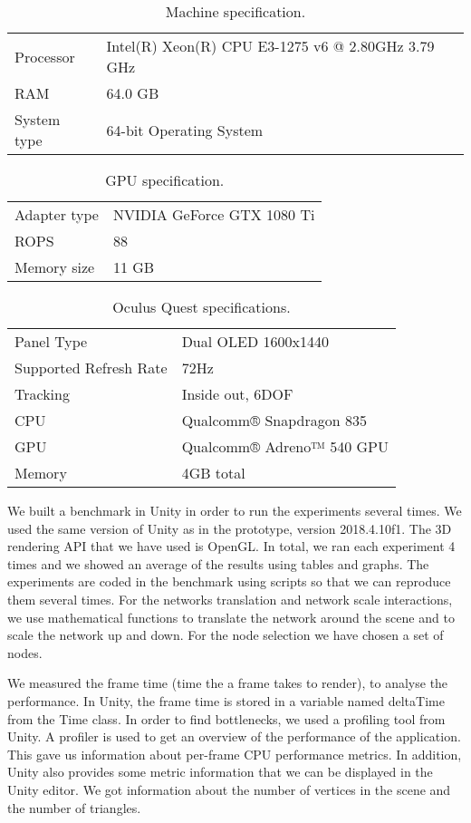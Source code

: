 \begin{table}[h!]
\centering
\begin{tabular}{ll}
Processor   & Intel(R) Xeon(R) CPU E3-1275 v6 @ 2.80GHz 3.79 GHz \\
RAM & 64.0 GB                                            \\
System type & 64-bit Operating System
\end{tabular}
\caption{Machine specification.}
\label{tab:machine-specs}
\end{table}

\begin{table}[h!]
\centering
\begin{tabular}{ll}
Adapter type   & NVIDIA GeForce GTX 1080 Ti \\
ROPS & 88 \\
Memory size & 11 GB \\
\end{tabular}
\caption{GPU specification.}
\label{tab:gpu-specs}
\end{table}

\begin{table}[h!]
\centering
\begin{tabular}{ll}
Panel Type   & Dual OLED 1600x1440 \\
Supported Refresh Rate  &  72Hz \\
Tracking & Inside out, 6DOF \\
CPU & Qualcomm® Snapdragon 835 \\
GPU & Qualcomm® Adreno™ 540 GPU \\
Memory & 4GB total
\end{tabular}
\caption{Oculus Quest specifications.}
\label{tab:oculus-specs}
\end{table}

We built a benchmark in Unity in order to run the experiments several times. We used the same version of Unity as in the prototype, version 2018.4.10f1. The 3D rendering API that we have used is OpenGL. In total, we ran each experiment 4 times and we showed an average of the results using tables and graphs. The experiments are coded in the benchmark using scripts so that we can reproduce them several times. For the networks translation and network scale interactions, we use mathematical functions to translate the network around the scene and to scale the network up and down. For the node selection we have chosen a set of nodes.

We measured the frame time (time the a frame takes to render), to analyse the performance. In Unity, the frame time is stored in a variable named deltaTime from the Time class. In order to find bottlenecks, we used a profiling tool from Unity. A profiler is used to get an overview of the performance of the application. This gave us information about per-frame CPU performance metrics. In addition, Unity also provides some metric information that we can be displayed in the Unity editor. We got information about the number of vertices in the scene and the number of triangles.


